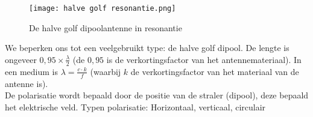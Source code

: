 \begin{figure}[H]
    \centering
    \texttt{[image: halve golf resonantie.png]}
    \caption{De halve golf dipoolantenne in resonantie}
    \end{figure}

We beperken ons tot een veelgebruikt type: de halve golf dipool. De lengte is ongeveer \(0,95 \times \frac{\lambda}{2}\) (de \(0,95\) is de verkortingsfactor van het antennemateriaal).
In een medium is \(\lambda = \frac{c \cdot k}{f}\) (waarbij \(k\) de verkortingsfactor van het materiaal van de antenne is).\\

De polarisatie wordt bepaald door de positie van de straler (dipool),
deze bepaald het elektrische veld.
Typen polarisatie: Horizontaal, verticaal, circulair